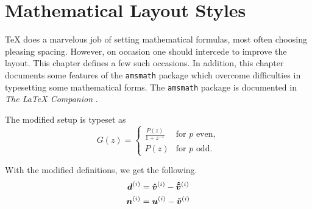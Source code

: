 \resetdatestamp

\newcommand\Dfrac[2]{\frac{\displaystyle #1}{\displaystyle #2}}
\newcommand{\mathBF}[1]{\mbox{\boldmath $#1$}}
\newcommand{\C}[1]{\mathBF{#1}}

\chapter{Mathematical Layout Styles}

\TeX{} does a marvelous job of setting mathematical formulas, most often
 choosing pleasing spacing.
However, on occasion one should intercede to improve the layout.
This chapter defines a few such occasions.
In addition, this chapter documents some features of the {\tt amsmath}
 package which overcome difficulties in typesetting some mathematical
 forms.
The {\tt amsmath} package is documented 
 in {\it The \LaTeX{} Companion} \cite{Goossens:1997}.

The modified setup is typeset as
\begin{equation}
  G(z) = \begin{cases}
           \Dfrac {P(z)}{1+z^{-1}} & \text{for $p$ even}, \\[1ex]
           P(z)                    & \text{for $p$ odd}.
         \end{cases}
\end{equation}

With the modified definitions, we get the following.
\def\hC#1{\C{\hat{#1}}\vphantom{\C{#1}}}           %
\def\htC#1{\C{\hat{\tilde{#1}}}\vphantom{\C{#1}}}  %
\def\tC#1{\C{\tilde{#1}}\vphantom{\C{#1}}}         %
\begin{equation}
\begin{split}
  \C{d}^{(i)} &= \hC{v}^{(i)} - \htC{v}^{(i)} \\
  \C{n}^{(i)} &= \C{u}^{(i)} - \tC{v}^{(i)}
\end{split}
\end{equation}

